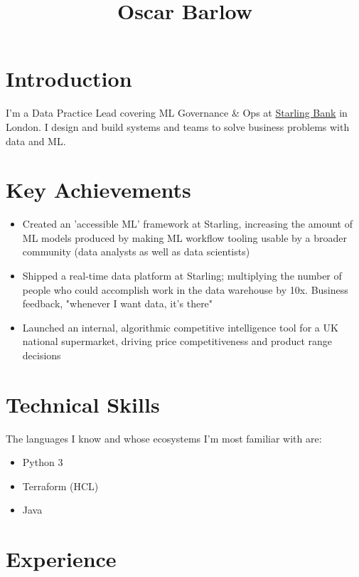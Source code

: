\documentclass[a4paper,10pt]{article}
\title{Oscar Barlow}
\date{}
\begin{document}
\maketitle

\section*{Introduction}
I'm a Data Practice Lead covering ML Governance \& Ops at \href{https://www.starlingbank.com/}{Starling Bank} in London. I design and build systems and teams to solve business problems with data and ML.

\section*{Key Achievements}
\begin{itemize}
    \item Created an 'accessible ML' framework at Starling, increasing the amount of ML models produced by making ML workflow tooling usable by a broader community (data analysts as well as data scientists)
    \item Shipped a real-time data platform at Starling; multiplying the number of people who could accomplish work in the data warehouse by 10x. Business feedback, "whenever I want data, it's there"
    \item Launched an internal, algorithmic competitive intelligence tool for a UK national supermarket, driving price competitiveness and product range decisions
\end{itemize}

\section*{Technical Skills}
The languages I know and whose ecosystems I'm most familiar with are:
\begin{itemize}
    \item Python 3
    \item Terraform (HCL)
    \item Java
\end{itemize}

\section*{Experience}
\end{document}
